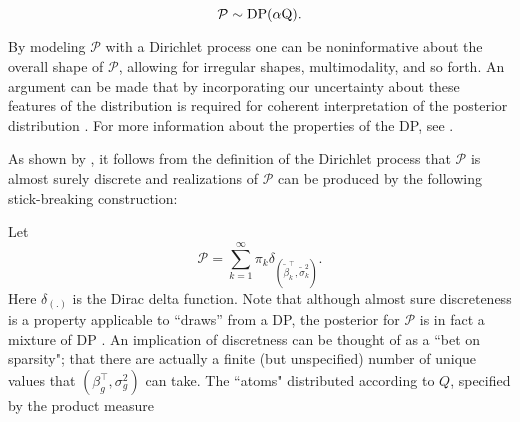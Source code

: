 \begin{equation}
\mathcal{P} \sim \operatorname{DP}(\alpha \mbox{Q}).
\end{equation}

\iftoggle{thesis}{
The use of this prior, due to \citet{ferguson}, is a distribution over probability distributions, such that for any finite disjoint partition $\{A_i\}_{i>=1}^n$ on $\mathbb{R}^p$, $\mathcal{P}$ is a random measure such that the joint distribution $\left(\mathcal{P}(A_1),\ldots,\mathcal{P}(A_n)\right) \sim \op{Dir}\left(\alpha Q(A_1),\ldots,\alpha Q(A_n)\right).$ The Dirichlet process has two parameters: $Q$, the base measure, represents a prior guess at the distribution. $\alpha$, the concentration parameter expresses the degree to which $\mathcal{P}$ will agree with $Q$ on any set $A$. This follows from the definition given above and known properties of the Dirichlet distribution, i.e., $\op{E}\left(\mathcal{P}(A)\right)=Q(A)$, and $\op{V}\left(\mathcal{P}(A)\right)=\frac{Q(A)(1 - Q(A)}{\alpha + 1}$, showing that $\mathcal{P}(A) \stackrel{p}{\rightarrow} Q(A)$ as $\alpha \rightarrow \infty$ for any set $A$. 
}{}
By modeling $\mathcal{P}$ with a Dirichlet process one can be noninformative about the overall shape of $\mathcal{P}$, allowing for irregular shapes, multimodality, and so forth. An argument can be made that by incorporating our uncertainty about these features of the distribution is required for coherent interpretation of the posterior distribution \citep{walker2010bayesian}. For more information about the properties of the DP, see \cite{ferguson}.

As shown by \citet{sethuraman}, it follows from the definition of the Dirichlet process that $\mathcal{P}$ is almost surely discrete and realizations of $\mathcal{P}$ can be produced by the following stick-breaking construction:

Let 
\begin{equation}
\mathcal{P} =\sum_{k=1}^\infty \pi_k \delta_{\left(\tilde{\beta}_k^\top ,\tilde{\sigma}^2_k\right)}.
\end{equation}
Here $\delta_{(.)}$ is the Dirac delta function. Note that although almost sure discreteness is a property applicable to ``draws'' from a DP, the posterior for $\mathcal{P}$ is in fact a mixture of DP \citep{antoniak}. An implication of discretness can be thought of as a ``bet on sparsity"; that there are actually a finite (but unspecified) number of unique values that $(\beta_g^\top,\sigma^2_g)$ can take.  
 The ``atoms" distributed according to $Q$, specified by the product measure

